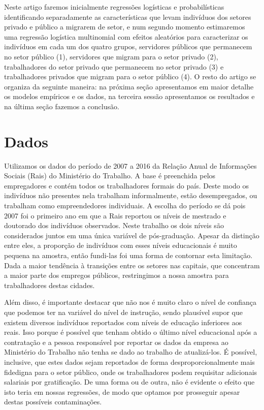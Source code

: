 \documentclass[a4paper]{article}
\begin{document}
Neste artigo faremos inicialmente regressões logísticas e probabilísticas identificando separadamente as características que levam indivíduos dos setores privado e público a migrarem de setor, e num segundo momento estimaremos uma regressão logística multinomial com efeitos aleatórios para caracterizar os indivíduos em cada um dos quatro grupos, servidores públicos que permanecem no setor público (1), servidores que migram para o setor privado (2), trabalhadores do setor privado que permanecem no setor privado (3) e trabalhadores privados que migram para o setor público (4). O resto do artigo se organiza da seguinte maneira: na próxima seção apresentamos em maior detalhe os modelos empíricos e os dados, na terceira sessão apresentamos os resultados e na última seção fazemos a conclusão.



\section{Dados}

Utilizamos os dados do período de 2007 a 2016 da Relação Anual de Informações Sociais (Rais) do Ministério do Trabalho. A base é preenchida pelos empregadores e contém todos os trabalhadores formais do país. Deste modo os  indivíduos não presentes nela trabalham informalmente, estão desempregados, ou trabalham como empreendedores individuais. A escolha do período se dá pois 2007 foi o primeiro ano em que a Rais reportou os níveis de mestrado e doutorado dos indivíduos observados. Neste trabalho os dois níveis são considerados juntos em uma única variável de pós-graduação. Apesar da distinção entre eles, a proporção de indivíduos com esses níveis educacionais é muito pequena na amostra, então fundi-las foi uma forma de contornar esta limitação. Dada a maior tendência à transições entre os setores nas capitais, que concentram a maior parte dos empregos públicos, restringimos a nossa amostra para trabalhadores destas cidades.

Além disso, é importante destacar que não nos é muito claro o nível de confiança que podemos ter na variável do nível de instrução, sendo plausível supor que existem diversos indivíduos reportados com níveis de educação inferiores aos reais. Isso porque é possível que tenham obtido o último nível educacional após a contratação e a pessoa responsável por reportar os dados da empresa ao Ministério do Trabalho não tenha se dado ao trabalho de atualizá-los. É possível, inclusive, que estes dados sejam reportados de forma desproporcionalmente mais fidedigna para o setor público, onde os trabalhadores podem requisitar adicionais salariais por gratificação. De uma forma ou de outra, não é evidente o efeito que isto teria em nossas regressões, de modo que optamos por prosseguir apesar destas possíveis contaminações.
\end{document}
